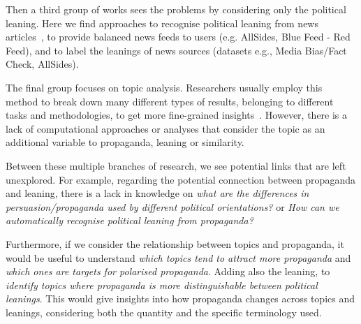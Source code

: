 Then a third group of works sees the problems by considering only the political leaning. Here we find approaches to recognise political leaning from news articles~\citep{baly2020we}, to provide balanced news feeds to users (e.g. AllSides, Blue Feed - Red Feed), and to label the leanings of news sources (datasets e.g., Media Bias/Fact Check, AllSides).

The final group focuses on topic analysis. Researchers usually employ this method to break down many different types of results, belonging to different tasks and methodologies, to get more fine-grained insights~\citep{zhang2023strategic}.
However, there is a lack of computational approaches or analyses that consider the topic as an additional variable to propaganda, leaning or similarity.


Between these multiple branches of research, we see potential links that are left unexplored.
For example, regarding the potential connection between propaganda and leaning, there is a lack in knowledge on \emph{what are the differences in persuasion/propaganda used by different political orientations?} or \emph{How can we automatically recognise political leaning from propaganda?}

Furthermore, if we consider the relationship between topics and propaganda, it would be useful to understand \emph{which topics tend to attract more propaganda} and \emph{which ones are targets for polarised propaganda}. Adding also the leaning, to \emph{identify topics where propaganda is more distinguishable between political leanings}. 
This would give insights into how propaganda changes across topics and leanings, considering both the quantity and the specific terminology used.



